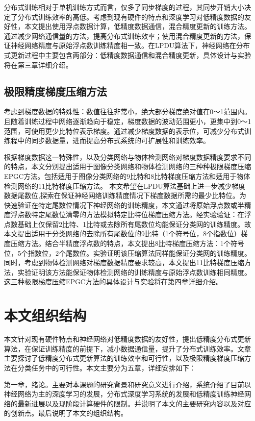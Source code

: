 分布式训练相对于单机训练方式而言，仅多了同步梯度的过程，其同步开销大小决定了分布式训练效率的高低。考虑到现有硬件的特点和深度学习对低精度数据的友好性，本文提出使用浮点数据计算，低精度数据通信，混合精度更新的训练方法。通过减少网络通信量的方法，提高分布式训练效率；使用混合精度更新的方法，保证神经网络精度与原始浮点数训练精度相一致。在LPDU算法下，神经网络在分布式更新过程中主要包含两部分：低精度数据通信和混合精度更新，具体设计与实验将在第三章详细介绍。

\subsection{极限精度梯度压缩方法}
考虑到梯度数据的特殊性：数值往往非常小，绝大部分梯度绝对值在0～1范围内。且随着训练过程中网络逐渐趋向于稳定，梯度数据的波动范围更小，更集中到0～1范围，可使用更少比特位表示梯度。通过减少梯度数据的表示位，可减少分布式训练程中的同步数据量，进而提高分布式系统的可扩展性和训练效率。

根据梯度数据这一特殊性，以及分类网络与物体检测网络对梯度数据精度要求不同的特点，本文分别提出适用于图像分类网络和物体检测网络的三种种极限梯度压缩EPGC方法。包括适用于图像分类网络的9比特和8比特梯度压缩方法和适用于物体检测网络的11比特梯度压缩方法。
本文希望在LPDU算法基础上进一步减少梯度数据尾数位,探索在保证神经网络训练精度情况下梯度数据所需的最少比特位。为快速验证在特定尾数位情况下神经网络的训练精度，本文通过将原始浮点数或半精度浮点数特定尾数位清零的方法模拟特定比特位梯度压缩方法。经实验验证：在浮点数基础上仅保留2比特、1比特或去除所有尾数位均能保证分类网的训练精度。故本文提出适用于分类网络的去除所有尾数位的9比特（1个符号位，8个指数位）梯度压缩方法。结合半精度浮点数的特点，本文提出8比特梯度压缩方法：1个符号位，5个指数位，2个尾数位。实验证明该压缩算法同样能保证分类网的训练精度。同时，考虑到物体检测网络对梯度数据精度要求较高，本文提出11比特梯度压缩方法，实验证明该方法能保证物体检测网络的训练精度与原始浮点数训练相同精度。这三种极限梯度压缩EPGC方法的具体设计与实验将在第四章详细介绍。
\section{本文组织结构}
本文针对现有硬件特点和神经网络对低精度数据的友好性，提出低精度分布式更新算法，在保证训练精度的前提下，减小数据通信量，提升了分布式训练效率。文章主要探讨了低精度分布式更新算法的训练效率和可行性，以及极限精度梯度压缩方法在分类任务中的可行性。本文主要分为五章，详细安排如下：

第一章，绪论。主要对本课题的研究背景和研究意义进行介绍，系统介绍了目前以神经网络为主的深度学习的发展，分布式深度学习系统的发展和低精度训练神经网络的最新进展以及现阶段计算硬件的限制。并说明了本文的主要研究内容以及对应的创新点。最后说明了本文的组织结构。

